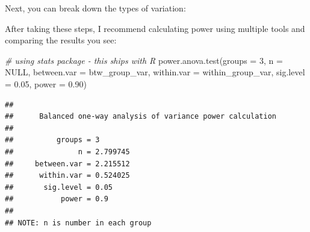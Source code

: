 \documentclass[
]{book}
\newenvironment{Shaded}{\begin{snugshade}}{\end{snugshade}}
\newcommand{\AttributeTok}[1]{\textcolor[rgb]{0.77,0.63,0.00}{#1}}
\newcommand{\CommentTok}[1]{\textcolor[rgb]{0.56,0.35,0.01}{\textit{#1}}}
\newcommand{\ConstantTok}[1]{\textcolor[rgb]{0.00,0.00,0.00}{#1}}
\newcommand{\DecValTok}[1]{\textcolor[rgb]{0.00,0.00,0.81}{#1}}
\newcommand{\FloatTok}[1]{\textcolor[rgb]{0.00,0.00,0.81}{#1}}
\newcommand{\FunctionTok}[1]{\textcolor[rgb]{0.00,0.00,0.00}{#1}}
\newcommand{\NormalTok}[1]{#1}
\newcommand{\OtherTok}[1]{\textcolor[rgb]{0.56,0.35,0.01}{#1}}
\newcommand{\SpecialCharTok}[1]{\textcolor[rgb]{0.00,0.00,0.00}{#1}}
\begin{document}
Next, you can break down the types of variation:

\begin{Shaded}
\end{Shaded}

After taking these steps, I recommend calculating power using multiple tools and comparing the results you see:

\begin{Shaded}
\begin{Highlighting}[]
\CommentTok{\# using \textquotesingle{}stats\textquotesingle{} package {-} this ships with R}
\FunctionTok{power.anova.test}\NormalTok{(}\AttributeTok{groups =} \DecValTok{3}\NormalTok{,}
                 \AttributeTok{n =} \ConstantTok{NULL}\NormalTok{,}
                 \AttributeTok{between.var =}\NormalTok{ btw\_group\_var,}
                 \AttributeTok{within.var =}\NormalTok{ within\_group\_var,}
                 \AttributeTok{sig.level =} \FloatTok{0.05}\NormalTok{,}
                 \AttributeTok{power =} \FloatTok{0.90}\NormalTok{)}
\end{Highlighting}
\end{Shaded}

\begin{verbatim}
## 
##      Balanced one-way analysis of variance power calculation 
## 
##          groups = 3
##               n = 2.799745
##     between.var = 2.215512
##      within.var = 0.524025
##       sig.level = 0.05
##           power = 0.9
## 
## NOTE: n is number in each group
\end{verbatim}

\begin{Shaded}
\end{Shaded}
\end{document}
